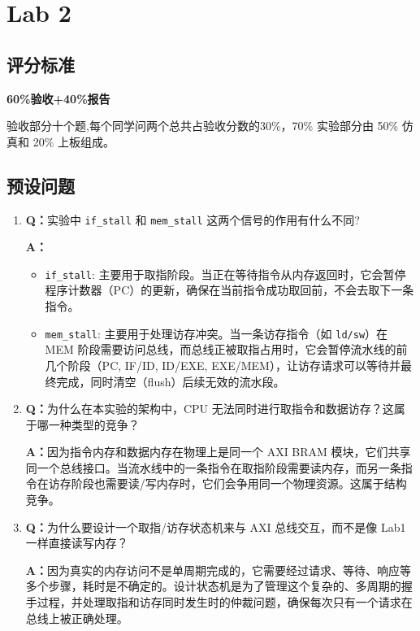 \chapter{Lab 2}


\section{评分标准}
\textbf{60\%验收+40\%报告}

验收部分十个题,每个同学问两个总共占验收分数的30\%，70\% 实验部分由 50\% 仿真和 20\% 上板组成。


\section{预设问题}

\begin{enumerate}
    \item \textbf{Q：}实验中 \texttt{if\_stall} 和 \texttt{mem\_stall} 这两个信号的作用有什么不同?

    \textbf{A：}
    \begin{itemize}
        \item \texttt{if\_stall}: 主要用于取指阶段。当正在等待指令从内存返回时，它会暂停程序计数器（PC）的更新，确保在当前指令成功取回前，不会去取下一条指令。
        \item \texttt{mem\_stall}: 主要用于处理访存冲突。当一条访存指令（如 \texttt{ld/sw}）在 MEM 阶段需要访问总线，而总线正被取指占用时，它会暂停流水线的前几个阶段（PC, IF/ID, ID/EXE, EXE/MEM），让访存请求可以等待并最终完成，同时清空（flush）后续无效的流水段。
    \end{itemize}

    \item \textbf{Q：}为什么在本实验的架构中，CPU 无法同时进行取指令和数据访存？这属于哪一种类型的竞争？

    \textbf{A：}因为指令内存和数据内存在物理上是同一个 AXI BRAM 模块，它们共享同一个总线接口。当流水线中的一条指令在取指阶段需要读内存，而另一条指令在访存阶段也需要读/写内存时，它们会争用同一个物理资源。这属于结构竞争。

    \item \textbf{Q：}为什么要设计一个取指/访存状态机来与 AXI 总线交互，而不是像 Lab1 一样直接读写内存？

    \textbf{A：}因为真实的内存访问不是单周期完成的，它需要经过请求、等待、响应等多个步骤，耗时是不确定的。设计状态机是为了管理这个复杂的、多周期的握手过程，并处理取指和访存同时发生时的仲裁问题，确保每次只有一个请求在总线上被正确处理。


\end{enumerate}
